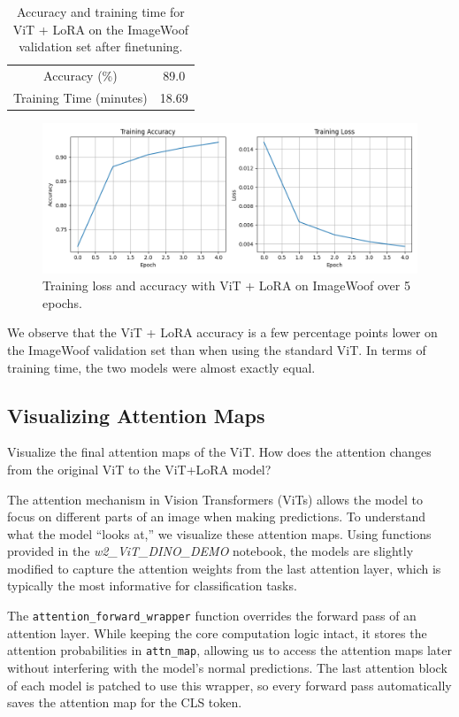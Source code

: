 \documentclass[10pt]{article}
\begin{document}
\begin{table}[ht]
    \centering
    \begin{tabular}{c|c}
        Accuracy (\%) &  89.0 \\
        Training Time (minutes) & 18.69
    \end{tabular}
    \caption{Accuracy and training time for ViT + LoRA on the ImageWoof validation set after finetuning.}
    \label{tab:placeholder}
\end{table}

\begin{figure}[ht]
    \centering
    \includegraphics[width=1\linewidth]{images/training_loss_curve_LoRA.png}
    \caption{Training loss and accuracy with ViT + LoRA on ImageWoof over 5 epochs.}
    \label{fig:placeholder}
\end{figure}

We observe that the ViT + LoRA accuracy is a few percentage points lower on the ImageWoof validation set than when using the standard ViT. In terms of training time, the two models were almost exactly equal.

\subsection{Visualizing Attention Maps}
Visualize the final attention maps of the ViT. How does the attention changes from the original ViT to the ViT+LoRA model?

The attention mechanism in Vision Transformers (ViTs) allows the model to focus on different parts of an image when making predictions. To understand what the model ``looks at,'' we visualize these attention maps. Using functions provided in the \textit{w2\_ViT\_DINO\_DEMO} notebook, the models are slightly modified to capture the attention weights from the last attention layer, which is typically the most informative for classification tasks.

The \texttt{attention\_forward\_wrapper} function overrides the forward pass of an attention layer. While keeping the core computation logic intact, it stores the attention probabilities in \texttt{attn\_map}, allowing us to access the attention maps later without interfering with the model's normal predictions. The last attention block of each model is patched to use this wrapper, so every forward pass automatically saves the attention map for the CLS token.
\end{document}
